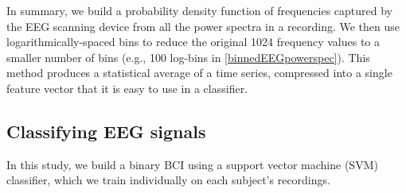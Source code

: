 
In summary, we build a probability density function of frequencies captured by the EEG scanning device from all the power spectra in a recording. We then use logarithmically-spaced bins to reduce the original 1024 frequency values to a smaller number of bins (e.g., 100 log-bins in \ref{binnedEEGpowerspec}). This method produces a statistical average of a time series, compressed into a single feature vector that it is easy to use in a classifier.







\subsection{Classifying EEG signals}

In this study, we build a binary BCI using a support vector machine (SVM) classifier, which we train individually on each subject's recordings. 

